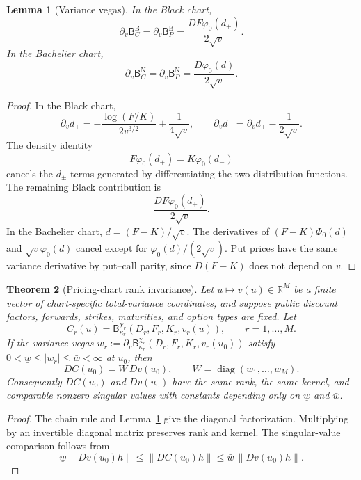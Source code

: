 \documentclass[11pt,a4paper]{amsart}
\theoremstyle{plain}
\newtheorem{theorem}{Theorem}[section]
\newtheorem{lemma}[theorem]{Lemma}
\theoremstyle{definition}
\theoremstyle{remark}
\newcommand{\R}{\mathbb{R}}
\begin{document}
\begin{lemma}[Variance vegas]\label{lem:variance-vegas}
In the Black chart,
\[
        \partial_v\mathsf B_C^{\mathrm B}
        =
        \partial_v\mathsf B_P^{\mathrm B}
        =
        \frac{DF\varphi_0(d_+)}{2\sqrt v}.
\]
In the Bachelier chart,
\[
        \partial_v\mathsf B_C^{\mathrm N}
        =
        \partial_v\mathsf B_P^{\mathrm N}
        =
        \frac{D\varphi_0(d)}{2\sqrt v}.
\]
\end{lemma}

\begin{proof}
In the Black chart,
\[
        \partial_v d_+=-\frac{\log(F/K)}{2v^{3/2}}+\frac{1}{4\sqrt v},
        \qquad
        \partial_v d_- = \partial_v d_+-\frac{1}{2\sqrt v}.
\]
The density identity
\[
        F\varphi_0(d_+)=K\varphi_0(d_-)
\]
cancels the \(d_\pm\)-terms generated by differentiating the two distribution functions.  The
remaining Black contribution is
\[
        \frac{D F\varphi_0(d_+)}{2\sqrt v}.
\]
In the Bachelier chart, \(d=(F-K)/\sqrt v\).  The derivatives of
\((F-K)\Phi_0(d)\) and \(\sqrt v\varphi_0(d)\) cancel except for
\(\varphi_0(d)/(2\sqrt v)\).  Put prices have the same variance derivative by put--call parity,
since \(D(F-K)\) does not depend on \(v\).
\end{proof}

\begin{theorem}[Pricing-chart rank invariance]\label{thm:pricing-chart-rank-invariance}
Let \(u\mapsto v(u)\in\R^M\) be a finite vector of chart-specific total-variance coordinates,
and suppose public discount factors, forwards, strikes, maturities, and option types are fixed.
Let
\[
        C_r(u)
        =
        \mathsf B_{\kappa_r}^{\chi_r}
        \!\left(D_r,F_r,K_r,v_r(u)\right),
        \qquad r=1,\dots,M.
\]
If the variance vegas \(w_r:=\partial_v\mathsf B_{\kappa_r}^{\chi_r}(D_r,F_r,K_r,v_r(u_0))\)
satisfy \(0<\underline w\le |w_r|\le\bar w<\infty\) at \(u_0\), then
\[
        DC(u_0)=W\,Dv(u_0),
        \qquad
        W=\operatorname{diag}(w_1,\dots,w_M).
\]
Consequently \(DC(u_0)\) and \(Dv(u_0)\) have the same rank, the same kernel, and comparable
nonzero singular values with constants depending only on \(\underline w\) and \(\bar w\).
\end{theorem}

\begin{proof}
The chain rule and Lemma~\ref{lem:variance-vegas} give the diagonal factorization.  Multiplying
by an invertible diagonal matrix preserves rank and kernel.  The singular-value comparison
follows from
\[
        \underline w\,\|Dv(u_0)h\|
        \le
        \|DC(u_0)h\|
        \le
        \bar w\,\|Dv(u_0)h\|.
\]
\end{proof}
\end{document}

